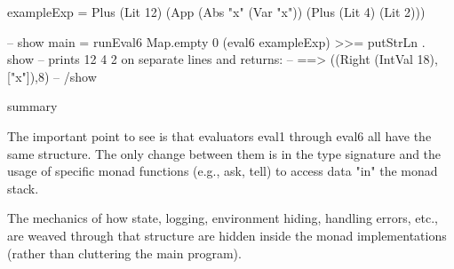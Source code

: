 exampleExp = Plus (Lit 12) (App (Abs "x" (Var "x")) (Plus (Lit 4) (Lit 2)))

-- show
main = runEval6 Map.empty 0 (eval6 exampleExp) >>= putStrLn . show
       -- prints 12 4 2 on separate lines and returns:
       -- ==> ((Right (IntVal 18),["x"]),8)
-- /show

summary

The important point to see is that evaluators eval1 through eval6 all have the same structure. The only change between them is in the type signature and the usage of specific monad functions (e.g., ask, tell) to access data "in" the monad stack.

The mechanics of how state, logging, environment hiding, handling errors, etc., are weaved through that structure are hidden inside the monad implementations (rather than cluttering the main program).






   

